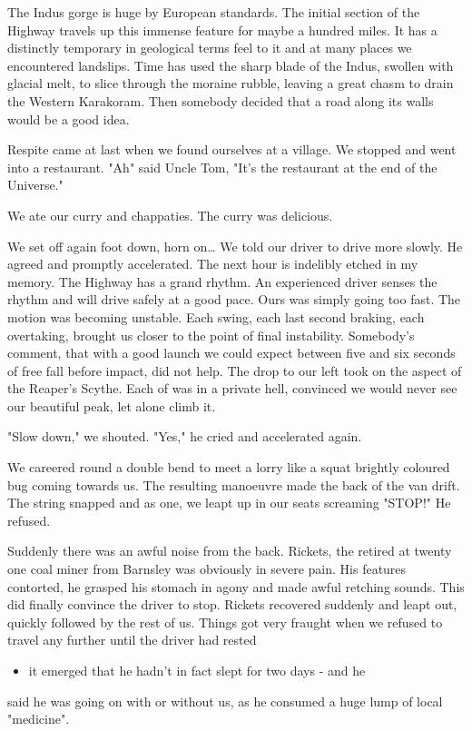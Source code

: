 \documentclass[a5paper,openany,font 10pt]{scrbook}
\begin{document}
The Indus gorge is huge by European standards. The initial
section of the Highway travels up this immense feature for maybe
a hundred miles. It has a distinctly temporary  in geological
terms  feel to it and at many places we encountered landslips.
Time has used the sharp blade of the Indus, swollen with glacial
melt, to slice through the moraine rubble, leaving a great chasm
to drain the Western Karakoram. Then somebody decided that a road
along its walls would be a good idea.

Respite came at last when we found ourselves at a village.
We stopped and went into a restaurant.
	"Ah" said Uncle Tom, "It's the restaurant at the end of the
Universe."

We ate our curry and chappaties. The curry was delicious.

We set off again  foot down, horn on\ldots{}  We told our driver
to drive more slowly. He agreed   and promptly accelerated. The
next hour is indelibly etched in my memory. The Highway has a
grand rhythm. An experienced driver senses the rhythm and will
drive safely at a good pace. Ours was simply going too fast. The
motion was becoming unstable. Each swing, each last second
braking, each overtaking, brought us closer to the point of final
instability. Somebody's comment, that with a good launch we could
expect between five and six seconds of free fall before impact,
did not help. The drop to our left took on the aspect of the
Reaper's Scythe. Each of was in a private hell, convinced we
would never see our beautiful peak, let alone climb it.

"Slow down," we shouted.
"Yes," he cried   and accelerated again.

We careered round a double bend to meet a lorry like a squat
brightly coloured bug coming towards us. The resulting manoeuvre
made the back of the van drift. The string snapped and as one, we
leapt up in our seats screaming "STOP!" He refused.

Suddenly there was an awful noise from the back. Rickets,
the retired  at twenty one  coal miner from Barnsley was
obviously in severe pain. His features contorted, he grasped his
stomach in agony and made awful retching sounds. This did finally
convince the driver to stop. Rickets recovered suddenly and leapt
out, quickly followed by the rest of us. Things got very fraught
when we refused to travel any further until the driver had rested
\begin{itemize}
\item it emerged that he hadn't in fact slept for two days - and he
\end{itemize}
said he was going on with or without us, as he consumed a huge
lump of local "medicine".
\end{document}
